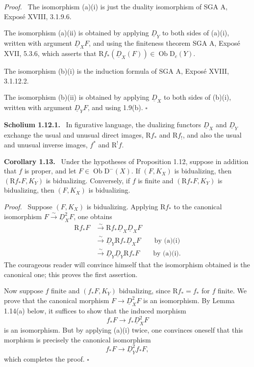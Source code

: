 \documentclass[12pt]{article}
\newcommand{\ob}{\operatorname{Ob}}
\newcommand{\D}{\mathrm D}
\newcommand{\R}{\mathrm R}
\newcommand{\qedtext}{\hfill$\square$}
\newenvironment{statement}[1]{\par\medskip\noindent\textbf{#1.}\ }{\par\medskip}
\newenvironment{prooftext}[1][Proof]{\par\noindent\emph{#1.}\ }{\par\medskip}
\begin{document}
\begin{prooftext}
The isomorphism (a)(i) is just the duality isomorphism of SGA A, Exposé XVIII, 3.1.9.6.

The isomorphism (a)(ii) is obtained by applying $\underline D_Y$ to both sides of (a)(i), written with argument $\underline D_XF$, and using the finiteness theorem SGA A, Exposé XVII, 5.3.6, which asserts that $\R f_*(\underline D_X(F))\in\ob\D_c(Y)$.

The isomorphism (b)(i) is the induction formula of SGA A, Exposé XVIII, 3.1.12.2.

The isomorphism (b)(ii) is obtained by applying $\underline D_X$ to both sides of (b)(i), written with argument $\underline D_YF$, and using 1.9(b). \qedtext
\end{prooftext}

\begin{statement}{Scholium 1.12.1}
In figurative language, the dualizing functors $\underline D_X$ and $\underline D_Y$ exchange the usual and unusual direct images, $\R f_*$ and $\R f_!$, and also the usual and unusual inverse images, $f^*$ and $\R^!f$.
\end{statement}

\begin{statement}{Corollary 1.13}
Under the hypotheses of Proposition 1.12, suppose in addition that $f$ is proper, and let $F\in\ob\D^-(X)$. If $(F,K_X)$ is bidualizing, then $(\R f_*F,K_Y)$ is bidualizing. Conversely, if $f$ is finite and $(\R f_*F,K_Y)$ is bidualizing, then $(F,K_X)$ is bidualizing.
\end{statement}

\begin{prooftext}
Suppose $(F,K_X)$ is bidualizing. Applying $\R f_*$ to the canonical isomorphism $F\xrightarrow{\sim}\underline D_X^2F$, one obtains
\begin{align*}
\R f_*F &\xrightarrow{\sim}\R f_*\underline D_X\underline D_XF \\
&\xrightarrow{\sim}\underline D_Y\R f_*\underline D_XF \qquad \text{by (a)(i)}\\
&\xrightarrow{\sim}\underline D_Y\underline D_Y\R f_*F \qquad \text{by (a)(i)}.
\end{align*}
The courageous reader will convince himself that the isomorphism obtained is the canonical one; this proves the first assertion.

Now suppose $f$ finite and $(f_*F,K_Y)$ bidualizing, since $\R f_*=f_*$ for $f$ finite. We prove that the canonical morphism $F\to\underline D_X^2F$ is an isomorphism. By Lemma 1.14(a) below, it suffices to show that the induced morphism
\[
   f_*F\longrightarrow f_*\underline D_X^2F
\]
is an isomorphism. But by applying (a)(i) twice, one convinces oneself that this morphism is precisely the canonical isomorphism
\[
   f_*F\longrightarrow \underline D_Y^2f_*F,
\]
which completes the proof. \qedtext
\end{prooftext}
\end{document}
